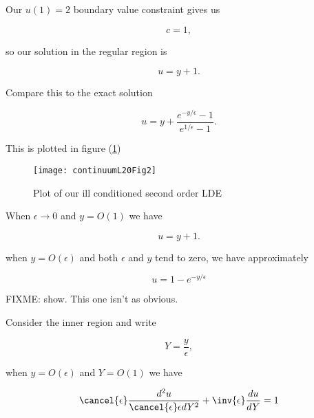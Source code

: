 Our $u(1) = 2$ boundary value constraint gives us

\begin{equation}\label{eqn:continuumL20:n}
c = 1,
\end{equation}

so our solution in the regular region is

\begin{equation}\label{eqn:continuumL20:n}
u = y + 1.
\end{equation}

Compare this to the exact solution

\begin{equation}\label{eqn:continuumL20:310}
u = y + \frac{e^{-y/\epsilon} - 1}{e^{1/\epsilon} - 1}.
\end{equation}

This is plotted in figure (\ref{fig:continuumL20:continuumL20Fig2})
\begin{figure}[htp]
   \centering
   \texttt{[image: continuumL20Fig2]}
   \caption{Plot of our ill conditioned second order LDE}\label{fig:continuumL20:continuumL20Fig2}
\end{figure}

When $\epsilon \rightarrow 0$ and $y = O(1)$ we have

\begin{equation}\label{eqn:continuumL20:330}
u = y + 1.
\end{equation}

when $y = O(\epsilon)$ and both $\epsilon$ and $y$ tend to zero, we have approximately

\begin{equation}\label{eqn:continuumL20:350}
u = 1 - e^{-y/\epsilon}
\end{equation}

FIXME: show.  This one isn't as obvious.

Consider the inner region and write

\begin{equation}\label{eqn:continuumL20:n}
Y = \frac{y}{\epsilon},
\end{equation}

when $y = O(\epsilon)$ and $Y = O(1)$ we have

\begin{equation}\label{eqn:continuumL20:n}
\cancel{\epsilon} \frac{d^2 u}{\cancel{\epsilon} \epsilon dY^2} + \inv{\epsilon} \frac{du}{dY} = 1
\end{equation}

